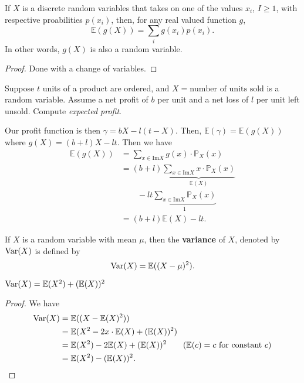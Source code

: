 
\begin{prop}
	If \( X \) is a discrete random variables that takes on one of the values \( x_i \), \( I\ge 1 \), with respective proabilities \( p(x_i) \), then, for any real valued function \( g \), \[
		\mathbb{E}(g(X)) = \sum_{i} g(x_i)p(x_i)
	.\] In other words, \( g(X) \) is also a random variable.
\end{prop}
\begin{proof}
	Done with a change of variables.
\end{proof}

\begin{eg}
	Suppose \( t \) units of a product are ordered, and \( X = \text{number of units sold} \) is a random variable. Assume a net profit of \( b \) per unit and a net loss of \( l \) per unit left unsold. Compute \textit{expected profit}.
\end{eg}
\begin{explanation}
	Our profit function is then \( \gamma = bX - l(t-X) \). Then, \( \mathbb{E}(\gamma ) = \mathbb{E}(g(X)) \) where \( g(X) = (b+l)X - lt \). Then we have
	\begin{align*}
		\mathbb{E}(g(X)) &= \sum_{x \in \text{Im}X} g(x) \cdot \mathbb{P}_X(x) \\
										 &= (b+l)\underbrace{\sum_{x \in \text{Im}X} x \cdot \mathbb{P}_X(x)}_{\mathbb{E}(X)} \\ & \qquad - lt \underbrace{\sum_{x \in \text{Im}X} \mathbb{P}_X(x)}_{1}\\ 
		&= (b+l)\mathbb{E}(X) - lt
	.\end{align*}
\end{explanation}

\begin{definition}
	If \( X \) is a random variable with mean \( \mu  \), then the \textbf{variance} of \( X \), denoted by \( \operatorname{Var}(X) \) is defined by \[
		\operatorname{Var}(X) = \mathbb{E}((X - \mu )^{2} )
	.\] 
\end{definition}

\begin{prop}
	\( \operatorname{Var}(X) = \mathbb{E}(X^{2} ) + (\mathbb{E}(X))^{2} \)
\end{prop}
\begin{proof}
	We have 
	\begin{align*}
		\Var(X) &= \mathbb{E}((X - \mathbb{E}(X)^{2})) \\
						&= \mathbb{E}(X^{2} - 2x\cdot \mathbb{E}(X) + (\mathbb{E}(X))^{2}   ) \\
						&= \mathbb{E}(X^{2} ) - 2 \mathbb{E}(X) + (\mathbb{E}(X))^{2} \tag{\( \mathbb{E}(c) = c \) for constant \( c \)} \\
						&= \mathbb{E}(X^{2} ) - (\mathbb{E}(X))^{2}
	.\end{align*}
\end{proof}

